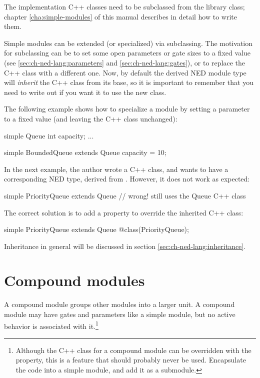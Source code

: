 The implementation C++ classes need to be subclassed from the
 library class; chapter \ref{cha:simple-modules} of
this manual describes in detail how to write them.

Simple modules can be extended (or specialized) via subclassing. The
motivation for subclassing can be to set some open parameters or gate sizes
to a fixed value (see \ref{sec:ch-ned-lang:parameters} and
\ref{sec:ch-ned-lang:gates}), or to replace the C++ class with a different
one. Now, by default the derived NED module type will \textit{inherit} the
C++ class from its base, so it is important to remember that you need to
write out  if you want it to use the new class.

The following example shows how to specialize a module by setting a parameter
to a fixed value (and leaving the C++ class unchanged):

\begin{ned}
simple Queue
{
   int capacity;
   ...
}

simple BoundedQueue extends Queue
{
   capacity = 10;
}
\end{ned}

In the next example, the author wrote a  C++ class, and
wants to have a corresponding NED type, derived from . However,
it does not work as expected:

\begin{ned}
simple PriorityQueue extends Queue // wrong! still uses the Queue C++ class
{
}
\end{ned}

The correct solution is to add a  property to override the
inherited C++ class:

\begin{ned}
simple PriorityQueue extends Queue
{
   @class(PriorityQueue);
}
\end{ned}

Inheritance in general will be discussed in section \ref{sec:ch-ned-lang:inheritance}.



\section{Compound modules}
\label{sec:ch-ned-lang:compound-modules}

A compound module groups other modules into a larger unit. A compound
module may have gates and parameters like a simple module, but no active
behavior is associated with it.\footnote{Although the C++ class
for a compound module can be overridden with the  property,
this is a feature that should probably never be used. Encapsulate the code
into a simple module, and add it as a submodule.}

